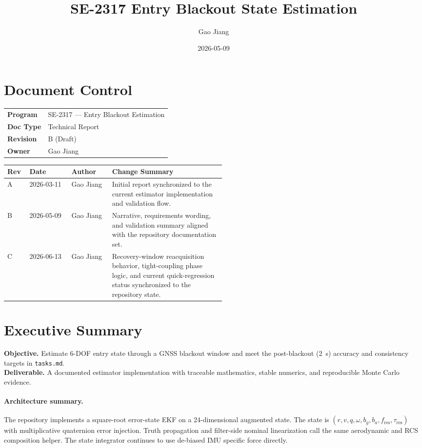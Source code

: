 \documentclass[10pt]{article}
\title{SE-2317 Entry Blackout State Estimation}
\author{Gao Jiang}
\date{2026-05-09}
\begin{document}
\maketitle

\section*{Document Control}
\begin{tabular}{@{} l l @{}}
  \textbf{Program} & SE-2317 --- Entry Blackout Estimation \\
  \textbf{Doc Type} & Technical Report \\
  \textbf{Revision} & B (Draft) \\
  \textbf{Owner} & Gao Jiang \\
\end{tabular}

\vspace{0.5em}
\begin{tabular}{@{} l l l p{0.52\linewidth} @{}}
  \toprule
  \textbf{Rev} & \textbf{Date} & \textbf{Author} & \textbf{Change Summary} \\
  \midrule
  A & 2026-03-11 & Gao Jiang & Initial report synchronized to the current estimator implementation and validation flow. \\
  B & 2026-05-09 & Gao Jiang & Narrative, requirements wording, and validation summary aligned with the repository documentation set. \\
  C & 2026-06-13 & Gao Jiang & Recovery-window reacquisition behavior, tight-coupling phase logic, and current quick-regression status synchronized to the repository state. \\
  \bottomrule
\end{tabular}

\section*{Executive Summary}
\textbf{Objective.} Estimate 6-DOF entry state through a GNSS blackout window and meet the post-blackout (2~s) accuracy and consistency targets in \texttt{tasks.md}.\\
\textbf{Deliverable.} A documented estimator implementation with traceable mathematics, stable numerics, and reproducible Monte Carlo evidence.

\paragraph{Architecture summary.}
The repository implements a square-root error-state EKF on a 24-dimensional augmented state.
The state is $(r,v,q,\omega,b_g,b_a,f_{\text{res}},\tau_{\text{res}})$ with multiplicative quaternion error injection.
Truth propagation and filter-side nominal linearization call the same aerodynamic and RCS composition helper.
The state integrator continues to use de-biased IMU specific force directly.
\end{document}
